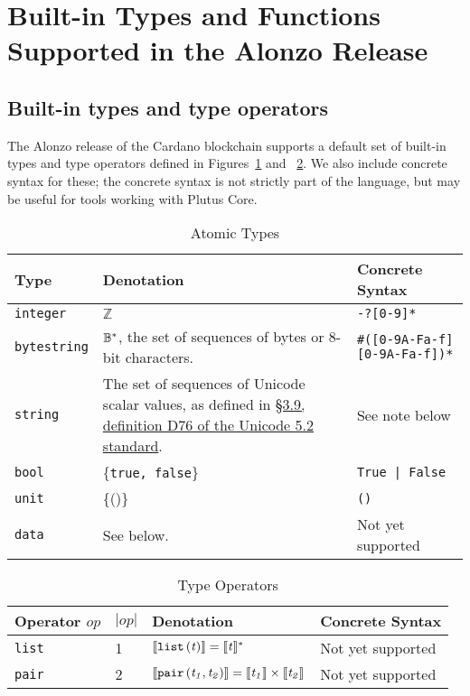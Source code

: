 \section{Built-in Types and Functions Supported in the Alonzo Release}
\label{appendix:default-builtins-alonzo}

\newcommand{\note}[1]{
  \bigskip
  \refstepcounter{note}
  \noindent\textbf{Note \thenote. #1}
}

\newcommand{\ty}[1]{\mathtt{#1}}
\subsection{Built-in types and type operators}
\label{sec:alonzo-built-in-types}
The Alonzo release of the Cardano blockchain supports a default set of built-in
types and type operators defined in Figures~\ref{fig:alonzo-built-in-types} and
~\ref{fig:alonzo-built-in-type-operators}.  We also include concrete syntax for
these; the concrete syntax is not strictly part of the language, but may be
useful for tools working with Plutus Core.
\begin{table}[H]
  \centering
    \begin{tabular}{|l|p{6cm}|l|}
        \hline
        Type & Denotation & Concrete Syntax\\
        \hline
        \texttt{integer} &   $\mathbb{Z}$ & \texttt{-?[0-9]*}\\
        \texttt{bytestring}  & $ \mathbb{B}^*$, the set of sequences of bytes or 8-bit characters. & \texttt{\#([0-9A-Fa-f][0-9A-Fa-f])*}\\
        \texttt{string} &   The set of sequences of Unicode scalar values, as defined in \href{http://www.unicode.org/versions/Unicode5.2.0/ch03.pdf#page=35}{§3.9, definition D76 of the Unicode 5.2 standard}. & See note below\\
        \texttt{bool} & \{\texttt{true, false}\} & \texttt{True | False}\\
        \texttt{unit} &  \{()\} & \texttt{()}\\
        \texttt{data} &  See below. & Not yet supported\\
        \hline
    \end{tabular}
    \caption{Atomic Types}
    \label{fig:alonzo-built-in-types}
\end{table}

\begin{table}[H]
  \centering
    \begin{tabular}{|l|p{14mm}|l|l|}
        \hline
        Operator $\mathit{op}$ & $\left|\mathit{op}\right|$  & Denotation & Concrete Syntax\\
        \hline
        \texttt{list} & 1 & $\llbracket\mathit{\mathtt{list}\,\mathtt{(}t\mathtt{)}}\rrbracket = \llbracket\mathit{t}\rrbracket^*$ & Not yet supported\\
        \texttt{pair} & 2 & $\llbracket\mathit{\mathtt{pair}\,\mathtt{(}t_1\mathtt{,}\,t_2\mathtt{)}}\rrbracket = \llbracket\mathit{t_1}\rrbracket \times \llbracket\mathit{t_2}\rrbracket$ & Not yet supported\\
        \hline
        \end{tabular}
   \caption{Type Operators}
    \label{fig:alonzo-built-in-type-operators}
\end{table}

